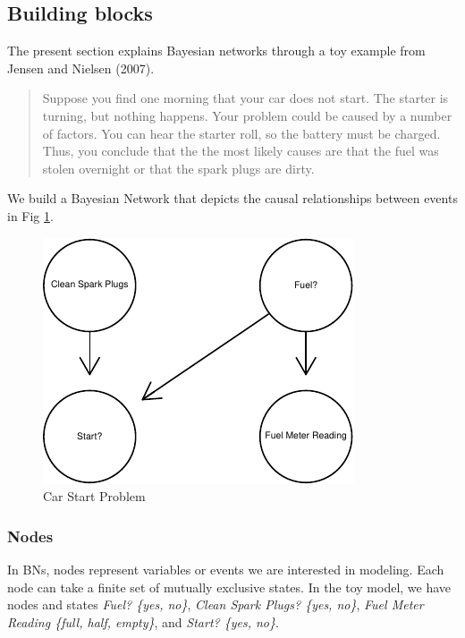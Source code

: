 \documentclass[twocol]{ametsoc}
\begin{document}
\hypertarget{building-blocks}{%
\subsection{Building blocks}\label{building-blocks}}

The present section explains Bayesian networks through a toy example
from Jensen and Nielsen (2007).

\begin{quote}
Suppose you find one morning that your car does not start. The starter
is turning, but nothing happens. Your problem could be caused by a
number of factors. You can hear the starter roll, so the battery must be
charged. Thus, you conclude that the the most likely causes are that the
fuel was stolen overnight or that the spark plugs are dirty.
\end{quote}

We build a Bayesian Network that depicts the causal relationships
between events in Fig \ref{fig:test}.

\begin{figure}

{\centering \includegraphics{paper_files/figure-latex/test-1} 

}

\caption{Car Start Problem}\label{fig:test}
\end{figure}

\hypertarget{nodes}{%
\subsubsection{Nodes}\label{nodes}}

In BNs, nodes represent variables or events we are interested in
modeling. Each node can take a finite set of mutually exclusive states.
In the toy model, we have nodes and states \emph{Fuel? \{yes, no\}},
\emph{Clean Spark Plugs? \{yes, no\}}, \emph{Fuel Meter Reading \{full,
half, empty\}}, and \emph{Start? \{yes, no\}}.
\end{document}
